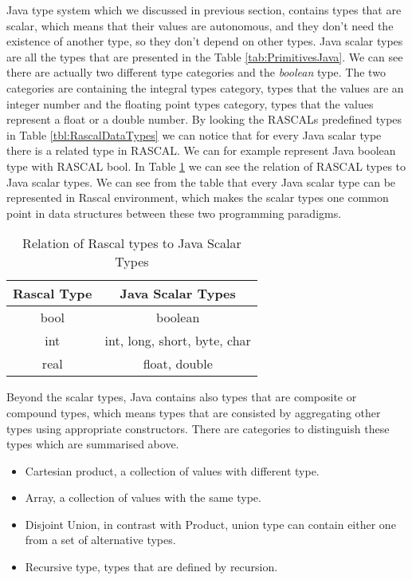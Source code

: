 Java type system which we discussed in previous section, contains types that are scalar, which means that their values are autonomous, and they don't need the existence of another type, so they don't depend on other types. Java scalar types are all the types that are presented in the Table \ref{tab:PrimitivesJava}. We can see there are actually two different type categories and the \textsl{boolean} type. The two categories are containing the integral types category, types that the values are an integer number and the floating point types category, types that the values represent a float or a double number. By looking the RASCALs predefined types in Table \ref{tbl:RascalDataTypes} we can notice that for every Java scalar type there is a related type in RASCAL. We can for example represent Java boolean type with RASCAL bool. In Table \ref{tbl:relRascalToJava} we can see the relation of RASCAL types to Java scalar types. We can see from the table that every Java scalar type can be represented in Rascal environment, which makes the scalar types one common point in data structures between these two programming paradigms.

\begin{table}[h]
\centering
\begin{tabular}{cc}
\hline
\textbf{Rascal Type} & \textbf{Java Scalar Types}\\\hline
bool & boolean\\
int & int, long, short, byte, char\\
real & float, double \\
\end{tabular}
\caption{Relation of Rascal types to Java Scalar Types}\label{tbl:relRascalToJava}
\end{table}

Beyond the scalar types, Java contains also types that are composite or compound\cite{coexistance} types, which means types that are consisted by aggregating other types using appropriate constructors\cite{paradigms}. There are categories to distinguish these types which are summarised above.

\begin{itemize}
\item Cartesian product, a collection of values with different type.
\item Array, a collection of values with the same type.
\item Disjoint Union, in contrast with Product, union type can contain either one from a set of alternative types.
\item Recursive type, types that are defined by recursion.
\end{itemize}



